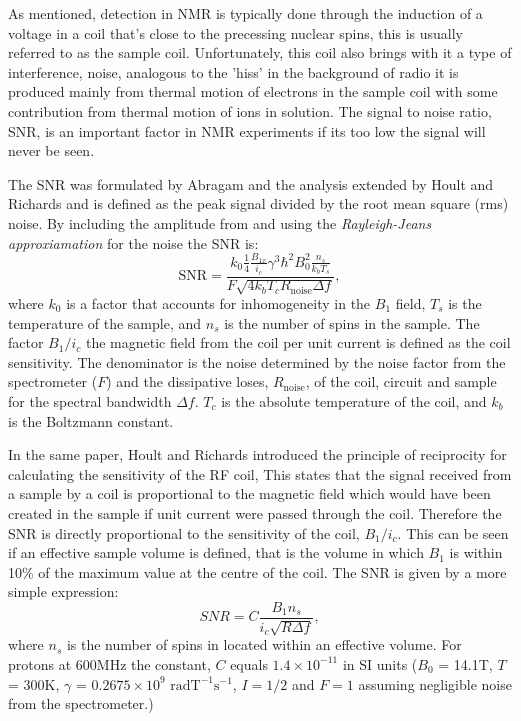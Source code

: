 As mentioned, detection in NMR is typically done through the induction of a voltage in a coil that's close
to the precessing nuclear spins, this is usually referred to as the sample coil. Unfortunately,
this coil also brings with it a type of interference, noise, analogous to the 'hiss' in the background
of radio it is produced mainly from thermal motion of electrons in the sample coil with some contribution from thermal
motion of ions in solution. The signal to noise ratio, SNR, is an important factor in NMR experiments if its too low
the signal will never be seen.

The SNR was formulated by Abragam\citep{Abragam:1961vg} and the analysis extended by Hoult and
Richards\citep{Hoult:1976dw} and is defined as the peak signal divided by the root mean square (rms) noise. By including
the amplitude from  and using the \textit{Rayleigh-Jeans approxiamation} for the noise the SNR is:
\begin{equation}\label{eqn:SNR}
  \text{SNR} = \frac{k_0\frac{1}{4}\frac{B_{1x}}{i_c}\gamma^3\hbar^2B_0^2\frac{n_s}{k_bT_s}}{F\sqrt{4k_bT_cR_{\text{noise}}\Delta{f}}},
\end{equation}
where $k_0$ is a factor that accounts for inhomogeneity in the $B_1$ field, $T_s$ is the
temperature of the sample, and $n_s$ is the number of spins in the sample. The factor $B_1/i_c$ the magnetic field from the coil per unit current is defined
as the coil sensitivity. The denominator is the noise determined by the noise factor from the spectrometer ($F$) and
the dissipative loses, $R_{\text{noise}}$, of the coil, circuit and sample for the spectral bandwidth $\Delta{f}$.
$T_c$ is the absolute temperature of the coil, and $k_b$ is the Boltzmann constant.

In the same paper, Hoult and Richards introduced the principle of reciprocity for calculating the
sensitivity of the RF coil, This states that the signal received from a sample by a coil is proportional to the magnetic
field which would have been created in the sample if unit current were passed through the coil. Therefore the SNR is
directly proportional to the sensitivity of the coil, $B_1/i_c$. This can be seen if an
effective sample volume is defined, that is the volume in which $B_1$ is within 10\% of the maximum
value at the centre of the coil. The SNR is given by a more simple expression\citep{vanBentum:2007fda}:
\begin{equation}
  SNR = C\frac{B_1n_s}{i_c\sqrt{R\Delta{f}}},
\end{equation}
where $n_s$ is the number of spins in located within an effective volume.
For protons at 600MHz the constant, $C$ equals $1.4\times10^{-11}$ in SI units ($B_0$ = 14.1T, $T$ = 300K, $\gamma$ =
$0.2675\times10^9$ $\text{rad} \text{T}^{-1}\text{s}^{-1}$, $I = 1/2$ and $F = 1$ assuming negligible noise from the spectrometer.)

